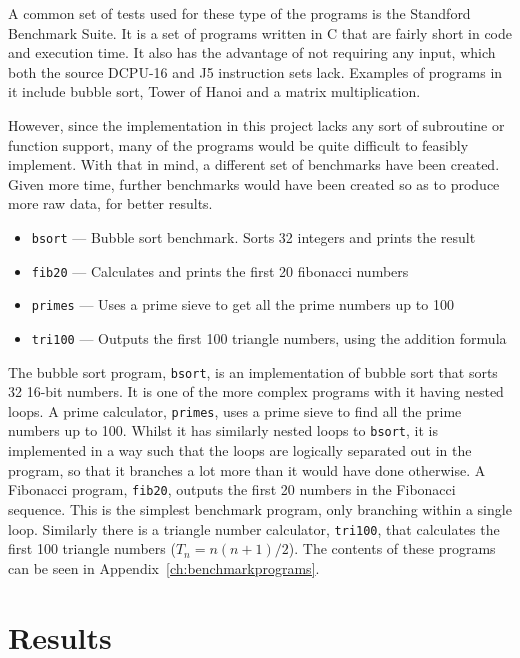 A common set of tests used for these type of the programs is the Standford
Benchmark Suite\cite{stanford}. It is a set of programs written in C that are
fairly short in code and execution time. It also has the advantage of not
requiring any input, which both the source DCPU-16 and J5 instruction sets lack.
Examples of programs in it include bubble sort, Tower of Hanoi and a matrix
multiplication.

However, since the implementation in this project lacks any sort of subroutine
or function support, many of the programs would be quite difficult to feasibly
implement. With that in mind, a different set of benchmarks have been created.
Given more time, further benchmarks would have been created so as to produce
more raw data, for better results.

\begin{itemize}[noitemsep]
  \item \texttt{bsort} --- Bubble sort benchmark. Sorts 32 integers and prints
  the result
  \item \texttt{fib20} --- Calculates and prints the first 20 fibonacci numbers
  \item \texttt{primes} --- Uses a prime sieve to get all the prime numbers up
  to 100
  \item \texttt{tri100} --- Outputs the first 100 triangle numbers, using the
    addition formula
\end{itemize}

The bubble sort program, \texttt{bsort}, is an implementation of bubble sort
that sorts 32 16-bit numbers. It is one of the more complex programs with it
having nested loops. A prime calculator, \texttt{primes}, uses a prime sieve to
find all the prime numbers up to 100. Whilst it has similarly nested loops to
\texttt{bsort}, it is implemented in a way such that the loops are logically
separated out in the program, so that it branches a lot more than it would have
done otherwise. A Fibonacci program, \texttt{fib20}, outputs the first 20
numbers in the Fibonacci sequence. This is the simplest benchmark program, only
branching within a single loop. Similarly there is a triangle number calculator,
\texttt{tri100}, that calculates the first 100 triangle numbers
($T_{n} = n(n+1)/2$). The contents of these programs can be seen in
Appendix~\ref{ch:benchmarkprograms}.

\section{Results}

